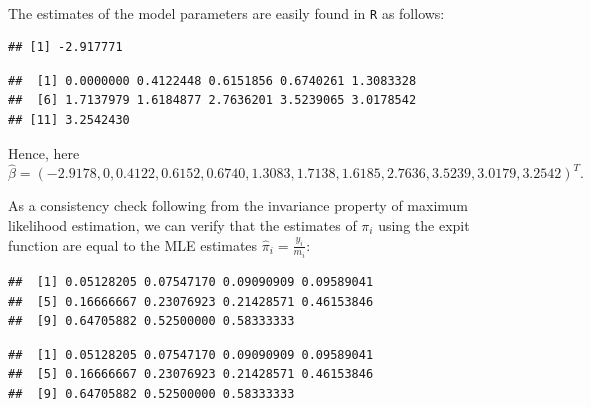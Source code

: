 \begin{solution}{2.9}
\begin{enumerate}
\begin{align*}
\end{align*}
The estimates of the model parameters are easily found in \texttt{R} as follows:
\begin{knitrout}
\color{fgcolor}\begin{kframe}
\begin{alltt}
 \hlkwb{<-} \hlstd{(y[}\hlstd{]}\hlopt{/}\hlstd{(m[}\hlstd{]}\hlopt{-}\hlstd{y[}\hlstd{])))}
\end{alltt}
\begin{verbatim}
## [1] -2.917771
\end{verbatim}
\begin{alltt}
 \hlkwb{<-} \hlstd{(}\hlstd{,}\hlstd{(y[}\hlopt{-}\hlstd{]}\hlopt{/}\hlstd{(m[}\hlopt{-}\hlstd{]}\hlopt{-}\hlstd{y[}\hlopt{-}\hlstd{]))}\hlopt{-}
\end{alltt}
\begin{verbatim}
##  [1] 0.0000000 0.4122448 0.6151856 0.6740261 1.3083328
##  [6] 1.7137979 1.6184877 2.7636201 3.5239065 3.0178542
## [11] 3.2542430
\end{verbatim}
\end{kframe}
\end{knitrout}
Hence, here $$\hat{\beta}=(-2.9178, 0, 0.4122, 0.6152, 0.6740, 1.3083, 1.7138, 1.6185, 2.7636, 3.5239, 3.0179, 3.2542)^{T}.$$

As a consistency check following from the invariance property of maximum likelihood estimation, we can verify that the estimates of $\pi_{i}$ using the expit function are equal to the MLE estimates $\hat{\pi}_{i}=\frac{y_{i}}{m_{i}}$:
\begin{knitrout}
\color{fgcolor}\begin{kframe}
\begin{alltt}
 \hlkwb{<-} \hlopt{+}\hlopt{/}\hlstd{(}\hlopt{+}\hlopt{+}
\end{alltt}
\begin{verbatim}
##  [1] 0.05128205 0.07547170 0.09090909 0.09589041
##  [5] 0.16666667 0.23076923 0.21428571 0.46153846
##  [9] 0.64705882 0.52500000 0.58333333
\end{verbatim}
\begin{alltt}
\hlopt{/}
\end{alltt}
\begin{verbatim}
##  [1] 0.05128205 0.07547170 0.09090909 0.09589041
##  [5] 0.16666667 0.23076923 0.21428571 0.46153846
##  [9] 0.64705882 0.52500000 0.58333333
\end{verbatim}
\end{kframe}
\end{knitrout}


\end{enumerate}
\end{solution}
